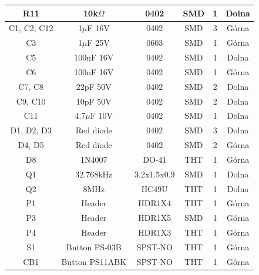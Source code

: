 \documentclass[12pt]{article} %
\numberwithin{equation}{subsection}
\numberwithin{figure}{section}
\numberwithin{table}{section}
\begin{document}
\begin{table}[!h]
\begin{tabular}{|c|c|c|c|c|c|}
R11                 & 10k$\Omega$                   & 0402             & SMD             & 1              & Dolna            \\ \hline
C1, C2, C12         & 1$\mu$F 16V                & 0402             & SMD             & 3              & Górna            \\ \hline
C3                  & 1$\mu$F 25V                & 0603             & SMD             & 1              & Górna            \\ \hline
C5                  & 100nF 16V              & 0402             & SMD             & 1              & Dolna            \\ \hline
C6                  & 100nF 16V              & 0402             & SMD             & 1              & Górna            \\ \hline
C7, C8              & 22pF 50V               & 0402             & SMD             & 2              & Dolna            \\ \hline
C9, C10             & 10pF 50V               & 0402             & SMD             & 2              & Dolna            \\ \hline
C11                 & 4.7$\mu$F 10V              & 0402             & SMD             & 1              & Dolna            \\ \hline
D1, D2, D3          & Red diode              & 0402             & SMD             & 3              & Dolna            \\ \hline
D4, D5              & Red diode              & 0402             & SMD             & 2              & Górna            \\ \hline
D8                  & 1N4007                 & DO-41            & THT             & 1              & Górna            \\ \hline
Q1                  & 32.768kHz              & 3.2x1.5x0.9    & SMD             & 1              & Dolna            \\ \hline
Q2                  & 8MHz                   & HC49U            & THT             & 1              & Dolna            \\ \hline
P1                  & Header                 & HDR1X4           & THT             & 1              & Górna            \\ \hline
P3                  & Header                 & HDR1X5           & SMD             & 1              & Górna            \\ \hline
P4                  & Header                 & HDR1X3           & THT             & 1              & Górna            \\ \hline
S1                  & Button PS-03B          & SPST-NO          & THT             & 1              & Górna            \\ \hline
CB1                 & Button PS11ABK         & SPST-NO          & THT             & 1              & Górna            \\ \hline
\end{tabular}
\end{table}
\end{document}
